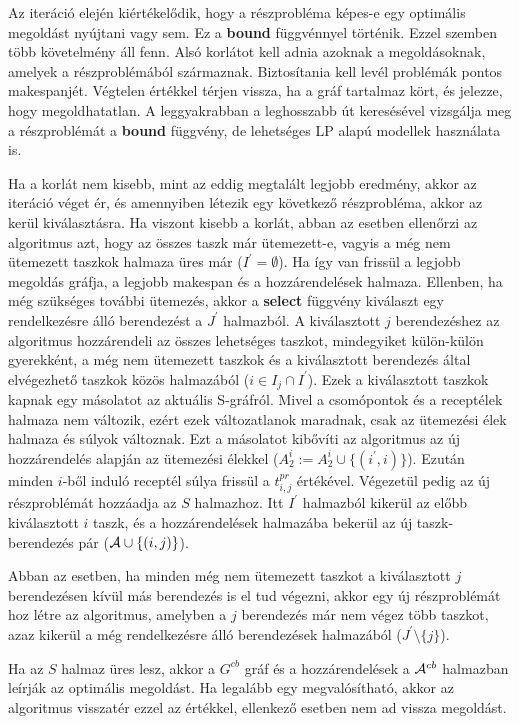 Az iteráció elején kiértékelődik, hogy a részprobléma képes-e egy optimális megoldást nyújtani vagy sem.
Ez a \textbf{bound} függvénnyel történik.
Ezzel szemben több követelmény áll fenn.
Alsó korlátot kell adnia azoknak a megoldásoknak, amelyek a részproblémából származnak.
Biztosítania kell levél problémák pontos makespanjét.
Végtelen értékkel térjen vissza, ha a gráf tartalmaz kört, és jelezze, hogy megoldhatatlan.
A leggyakrabban a leghosszabb út keresésével vizsgálja meg a részproblémát a \textbf{bound} függvény, de lehetséges LP alapú modellek használata is.

Ha a korlát nem kisebb, mint az eddig megtalált legjobb eredmény, akkor az iteráció véget ér, és amennyiben létezik egy következő részprobléma, akkor az kerül kiválasztásra.
Ha viszont kisebb a korlát, abban az esetben ellenőrzi az algoritmus azt, hogy az összes taszk már ütemezett-e, vagyis a még nem ütemezett taszkok halmaza üres már ($I^{'}=\emptyset$).
Ha így van frissül a legjobb megoldás gráfja, a legjobb makespan és a hozzárendelések halmaza.
Ellenben, ha még szükséges további ütemezés, akkor a \textbf{select} függvény kiválaszt egy rendelkezésre álló berendezést a $J^{'}$ halmazból.
A kiválasztott $j$ berendezéshez az algoritmus hozzárendeli az összes lehetséges taszkot, mindegyiket külön-külön gyerekként, a még nem ütemezett taszkok és a kiválasztott berendezés által elvégezhető taszkok közös halmazából ($i \in I_{j} \cap I^{'}$).
Ezek a kiválasztott taszkok kapnak egy másolatot az aktuális S-gráfról.
Mivel a csomópontok és a receptélek halmaza nem változik, ezért ezek változatlanok maradnak, csak az ütemezési élek halmaza és súlyok változnak.
Ezt a másolatot kibővíti az algoritmus az új hozzárendelés alapján az ütemezési élekkel ($A^{i}_{2}:= A^{i}_{2} \cup \{(i^{'},i)\}$).
Ezután minden $i$-ből induló receptél súlya frissül a $t^{pr}_{i,j}$ értékével.
Végezetül pedig az új részproblémát hozzáadja az $S$ halmazhoz.
Itt $I^{'}$ halmazból kikerül az előbb kiválasztott $i$ taszk, és a hozzárendelések halmazába bekerül az új taszk-berendezés pár (${\cal A}\cup\{(i,j)\}$).

Abban az esetben, ha minden még nem ütemezett taszkot a kiválasztott $j$ berendezésen kívül más berendezés is el tud végezni, akkor egy új részproblémát hoz létre az algoritmus, amelyben a $j$ berendezés már nem végez több taszkot, azaz kikerül a még rendelkezésre álló berendezések halmazából ($J^{'}\setminus\{j\}$).

Ha az $S$ halmaz üres lesz, akkor a $G^{cb}$ gráf és a hozzárendelések a ${\cal A}^{cb}$ halmazban leírják az optimális megoldást.
Ha legalább egy megvalósítható, akkor az algoritmus visszatér ezzel az értékkel, ellenkező esetben nem ad vissza megoldást.

